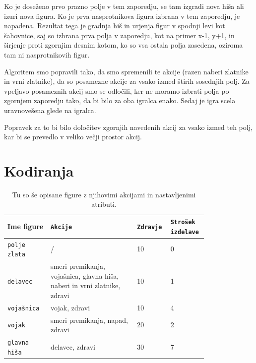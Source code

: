 \documentclass[a4paper, 12pt]{book}
\begin{document}
Ko je doseženo prvo prazno polje v tem zaporedju, se tam izgradi nova hiša ali izuri nova figura.
Ko je prva nasprotnikova figura izbrana v tem zaporedju, je napadena.
Rezultat tega je gradnja hiš in urjenja figur v spodnji levi kot šahovnice, saj so izbrana prva polja v zaporedju, kot na primer x-1, y+1, in širjenje proti zgornjim desnim kotom, ko so vsa ostala polja zasedena, oziroma tam ni nasprotnikovih figur.

Algoritem smo popravili tako, da smo spremenili te akcije (razen naberi zlatnike in vrni zlatnike), da so posamezne akcije za vsako izmed štirih sosednjih polj.
Za vpeljavo posameznih akcij smo se odločili, ker ne moramo izbrati polja po zgornjem zaporedju tako, da bi bilo za oba igralca enako.
Sedaj je igra scela uravnovešena glede na igralca.

Popravek za to bi bilo določitev zgornjih navedenih akcij za vsako izmed teh polj, kar bi se prevedlo v veliko večji prostor akcij.

\section{Kodiranja}
\label{kodiranja}
\begin{table}

	\begin{center}
		
	\begin{tabular}{p{0.2\linewidth}|p{0.4\linewidth}|p{0.1\linewidth}|p{0.1\linewidth}}
		Ime figure          & {\tt Akcije}                                                              & {\tt Zdravje} & {\tt Strošek izdelave} \\ \hline
		{\tt polje zlata}   & /                                                                         & 10            & 0 \\
		{\tt delavec}       & smeri premikanja, vojašnica, glavna hiša, naberi in vrni zlatnike, zdravi & 10            & 1 \\
		{\tt vojašnica}     & vojak, zdravi                                                             & 10            & 4 \\
		{\tt vojak}         & smeri premikanja, napad, zdravi                                           & 20            & 2 \\
		{\tt glavna hiša}   & delavec, zdravi                                                           & 30            & 7 \\
	\end{tabular}
	\end{center}
	\caption{Tu so še opisane figure z njihovimi akcijami in nastavljenimi atributi.}
	\label{tabelfigures}
\end{table}
\end{document}
